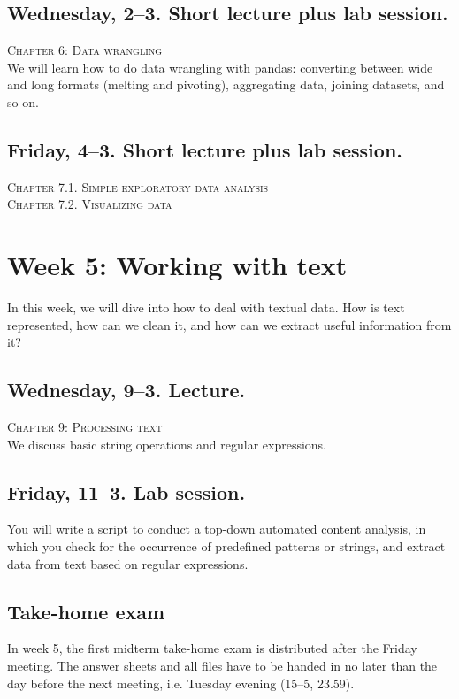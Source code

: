 \subsection*{Wednesday, 2--3. Short lecture plus lab session.}
\textsc{ Chapter 6: Data wrangling}\\
We will learn how to do data wrangling with pandas: converting between wide and long formats (melting and pivoting), aggregating data, joining datasets, and so on.

\subsection*{Friday, 4--3.  Short lecture plus lab session.}
\textsc{ Chapter 7.1. Simple exploratory data analysis}\\
\textsc{ Chapter 7.2. Visualizing data}\\




\section*{Week 5: Working with text}
In this week, we will dive into how to deal with textual data. How is text represented, how can we clean it, and how can we extract useful information from it?

\subsection*{Wednesday, 9--3. Lecture.}
\textsc{ Chapter 9: Processing text}\\
We discuss basic string operations and regular expressions.


\subsection*{Friday, 11--3. Lab session.}
You will write a script to conduct a top-down automated content analysis, in which you check for the occurrence of predefined patterns or strings, and extract data from text based on regular expressions.



\subsection*{Take-home exam}
In week 5, the first midterm take-home exam is distributed after the Friday meeting. The answer sheets and all files have to be handed in no later than the day before the next meeting, i.e. Tuesday evening (15--5, 23.59).




